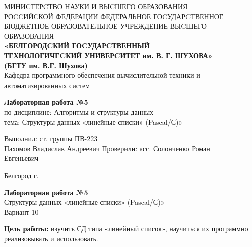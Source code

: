 \documentclass[a4paper,14pt]{extarticle}
\newcommand\textbox[1]{
	\parbox{.45\textwidth}{#1}
}
\begin{document}
\begin{center}
	\small{
		МИНИCТЕРCТВО НАУКИ И ВЫCШЕГО ОБРАЗОВАНИЯ \\РОCCИЙCКОЙ ФЕДЕРАЦИИ
		\bigbreak
		ФЕДЕРАЛЬНОЕ ГОCУДАРCТВЕННОЕ БЮДЖЕТНОЕ ОБРАЗОВАТЕЛЬНОЕ УЧРЕЖДЕНИЕ ВЫCШЕГО ОБРАЗОВАНИЯ \\
		\bigbreak
		\textbf{«БЕЛГОРОДCКИЙ ГОCУДАРCТВЕННЫЙ \\ТЕХНОЛОГИЧЕCКИЙ УНИВЕРCИТЕТ им. В. Г. ШУХОВА»\\ (БГТУ им. В.Г. Шухова)} \\
		\bigbreak
		Кафедра программного обеспечения вычислительной техники и автоматизированных систем\\}
\end{center}

\vfill
\begin{center}
	\large{
		\textbf{
			Лабораторная работа №5}}\\
	\normalsize{
		по дисциплине: Алгоритмы и структуры данных \\
		тема: Структуры данных «линейные списки» (Pascal/С)»}
\end{center}
\vfill
\hfill\textbox{
	Выполнил: ст. группы ПВ-223\\Пахомов Владислав Андреевич
	\bigbreak
	Проверили: асс. Солонченко Роман\\Евгеньевич
}
\vfill\begin{center}
	Белгород \the\year г.
\end{center}
\newpage
\begin{center}
	\textbf{Лабораторная работа №5}\\
	Структуры данных «линейные списки» (Pascal/С)»\\
	Вариант 10
\end{center}
\textbf{Цель работы: }изучить СД типа «линейный список», научиться их 
программно реализовывать и использовать.
\end{document}
